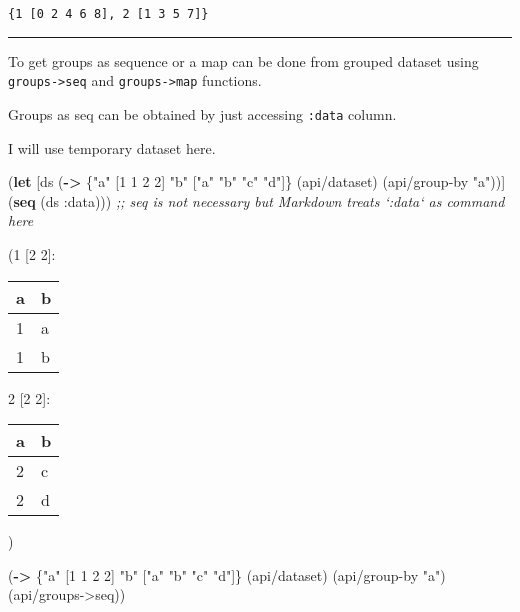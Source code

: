 \documentclass[]{article}
\newenvironment{Shaded}{\begin{snugshade}}{\end{snugshade}}
\newcommand{\KeywordTok}[1]{\textcolor[rgb]{0.13,0.29,0.53}{\textbf{#1}}}
\newcommand{\DecValTok}[1]{\textcolor[rgb]{0.00,0.00,0.81}{#1}}
\newcommand{\StringTok}[1]{\textcolor[rgb]{0.31,0.60,0.02}{#1}}
\newcommand{\CommentTok}[1]{\textcolor[rgb]{0.56,0.35,0.01}{\textit{#1}}}
\newcommand{\AttributeTok}[1]{\textcolor[rgb]{0.77,0.63,0.00}{#1}}
\newcommand{\NormalTok}[1]{#1}
\begin{document}
\begin{verbatim}
{1 [0 2 4 6 8], 2 [1 3 5 7]}
\end{verbatim}

\begin{center}\rule{0.5\linewidth}{0.5pt}\end{center}

To get groups as sequence or a map can be done from grouped dataset
using \texttt{groups-\textgreater{}seq} and
\texttt{groups-\textgreater{}map} functions.

Groups as seq can be obtained by just accessing \texttt{:data} column.

I will use temporary dataset here.

\begin{Shaded}
\begin{Highlighting}[]
\NormalTok{(}\KeywordTok{let}\NormalTok{ [ds (}\KeywordTok{->}\NormalTok{ \{}\StringTok{"a"}\NormalTok{ [}\DecValTok{1} \DecValTok{1} \DecValTok{2} \DecValTok{2}\NormalTok{]}
              \StringTok{"b"}\NormalTok{ [}\StringTok{"a"} \StringTok{"b"} \StringTok{"c"} \StringTok{"d"}\NormalTok{]\}}
\NormalTok{             (api/dataset)}
\NormalTok{             (api/group-by }\StringTok{"a"}\NormalTok{))]}
\NormalTok{  (}\KeywordTok{seq}\NormalTok{ (ds }\AttributeTok{:data}\NormalTok{))) }\CommentTok{;; seq is not necessary but Markdown treats `:data` as command here}
\end{Highlighting}
\end{Shaded}

(1 {[}2 2{]}:

\begin{longtable}[]{@{}ll@{}}
\toprule
a & b\tabularnewline
\midrule
\endhead
1 & a\tabularnewline
1 & b\tabularnewline
\bottomrule
\end{longtable}

2 {[}2 2{]}:

\begin{longtable}[]{@{}ll@{}}
\toprule
a & b\tabularnewline
\midrule
\endhead
2 & c\tabularnewline
2 & d\tabularnewline
\bottomrule
\end{longtable}

)

\begin{Shaded}
\begin{Highlighting}[]
\NormalTok{(}\KeywordTok{->}\NormalTok{ \{}\StringTok{"a"}\NormalTok{ [}\DecValTok{1} \DecValTok{1} \DecValTok{2} \DecValTok{2}\NormalTok{]}
     \StringTok{"b"}\NormalTok{ [}\StringTok{"a"} \StringTok{"b"} \StringTok{"c"} \StringTok{"d"}\NormalTok{]\}}
\NormalTok{    (api/dataset)}
\NormalTok{    (api/group-by }\StringTok{"a"}\NormalTok{)}
\NormalTok{    (api/groups->seq))}
\end{Highlighting}
\end{Shaded}
\end{document}
